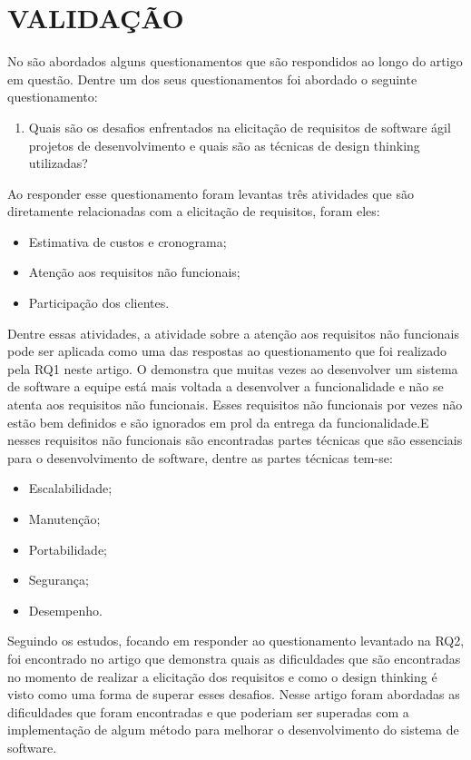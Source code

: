 \documentclass[a4paper,twoside]{article}
\begin{document}
\section{\uppercase{Validação}}

No \cite{DBLP:journals/information/MartinsJCKPO19} são abordados alguns questionamentos que são respondidos ao longo do artigo em questão. Dentre um dos seus questionamentos foi abordado o seguinte questionamento:
\begin{enumerate}
    \item Quais são os desafios enfrentados na elicitação de requisitos de software ágil projetos de desenvolvimento e quais são as técnicas de design thinking utilizadas?
\end{enumerate}

Ao responder esse questionamento foram levantas três atividades que são diretamente relacionadas com a elicitação de requisitos, foram eles:


\begin{itemize}
    \item Estimativa de custos e cronograma;
    \item Atenção aos requisitos não funcionais;
    \item Participação dos clientes.
\end{itemize}
Dentre essas atividades, a atividade sobre a atenção aos requisitos não funcionais pode ser aplicada como uma das respostas ao questionamento que foi realizado pela RQ1 neste artigo.
O \cite{DBLP:journals/information/MartinsJCKPO19} demonstra que muitas vezes ao desenvolver um sistema de software a equipe está mais voltada a desenvolver a funcionalidade e não se atenta aos requisitos não funcionais. Esses requisitos não funcionais por vezes não estão bem definidos e são ignorados em prol da entrega da funcionalidade.E nesses requisitos não funcionais são encontradas partes técnicas que são essenciais para o desenvolvimento de software, dentre as partes técnicas tem-se:

\begin{itemize}
    \item Escalabilidade;
    \item Manutenção;
    \item Portabilidade;
    \item Segurança;
    \item Desempenho.
\end{itemize}

Seguindo os estudos, focando em responder ao questionamento levantado na RQ2, foi encontrado no artigo \cite{DBLP:conf/sac/PereiraPPMC21} que demonstra quais as dificuldades que são encontradas no momento de realizar a elicitação dos requisitos e como o design thinking é visto como uma forma de superar esses desafios.
Nesse artigo foram abordadas as dificuldades que foram encontradas e que poderiam ser superadas com a implementação de algum método para melhorar o desenvolvimento do sistema de software.
\end{document}
